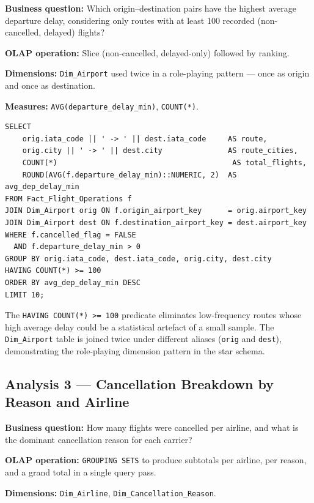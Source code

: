 \documentclass[12pt,a4paper]{article}
\begin{document}
\textbf{Business question:} Which origin–destination pairs have the highest
average departure delay, considering only routes with at least 100 recorded
(non-cancelled, delayed) flights?

\textbf{OLAP operation:} Slice (non-cancelled, delayed-only) followed by
ranking.

\textbf{Dimensions:} \texttt{Dim\_Airport} used twice in a role-playing
pattern — once as origin and once as destination.

\textbf{Measures:} \texttt{AVG(departure\_delay\_min)}, \texttt{COUNT(*)}.

\begin{lstlisting}[style=sql]
SELECT
    orig.iata_code || ' -> ' || dest.iata_code     AS route,
    orig.city || ' -> ' || dest.city               AS route_cities,
    COUNT(*)                                        AS total_flights,
    ROUND(AVG(f.departure_delay_min)::NUMERIC, 2)  AS avg_dep_delay_min
FROM Fact_Flight_Operations f
JOIN Dim_Airport orig ON f.origin_airport_key      = orig.airport_key
JOIN Dim_Airport dest ON f.destination_airport_key = dest.airport_key
WHERE f.cancelled_flag = FALSE
  AND f.departure_delay_min > 0
GROUP BY orig.iata_code, dest.iata_code, orig.city, dest.city
HAVING COUNT(*) >= 100
ORDER BY avg_dep_delay_min DESC
LIMIT 10;
\end{lstlisting}

The \texttt{HAVING COUNT(*) >= 100} predicate eliminates low-frequency routes
whose high average delay could be a statistical artefact of a small sample.
The \texttt{Dim\_Airport} table is joined twice under different aliases
(\texttt{orig} and \texttt{dest}), demonstrating the role-playing dimension
pattern in the star schema.

\subsection{Analysis 3 — Cancellation Breakdown by Reason and Airline}

\textbf{Business question:} How many flights were cancelled per airline, and
what is the dominant cancellation reason for each carrier?

\textbf{OLAP operation:} \texttt{GROUPING SETS} to produce subtotals per
airline, per reason, and a grand total in a single query pass.

\textbf{Dimensions:} \texttt{Dim\_Airline}, \texttt{Dim\_Cancellation\_Reason}.
\end{document}
